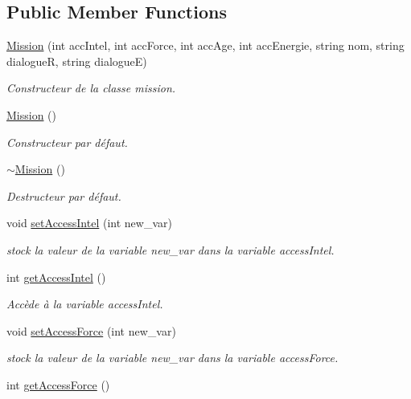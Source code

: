 \subsection*{Public Member Functions}
\begin{DoxyCompactItemize}
\item 
\hyperlink{class_mission_a7623e26167975876e1a7f483eed38d33}{Mission} (int acc\-Intel, int acc\-Force, int acc\-Age, int acc\-Energie, string nom, string dialogue\-R, string dialogue\-E)
\begin{DoxyCompactList}\small\item\em Constructeur de la classe mission. \end{DoxyCompactList}\item 
\hyperlink{class_mission_aa5a6ff4fc779338ab01b8f6dd470f4df}{Mission} ()
\begin{DoxyCompactList}\small\item\em Constructeur par défaut. \end{DoxyCompactList}\item 
\hyperlink{class_mission_ad1a61b34162393ac42be5955d9772921}{$\sim$\-Mission} ()
\begin{DoxyCompactList}\small\item\em Destructeur par défaut. \end{DoxyCompactList}\item 
void \hyperlink{class_mission_a8fb06ed6f8b7bf29b75729548c18c5e9}{set\-Access\-Intel} (int new\-\_\-var)
\begin{DoxyCompactList}\small\item\em stock la valeur de la variable new\-\_\-var dans la variable access\-Intel. \end{DoxyCompactList}\item 
int \hyperlink{class_mission_ab3ed2d8bde3f15489406775cec6ca3ae}{get\-Access\-Intel} ()
\begin{DoxyCompactList}\small\item\em Accède à la variable access\-Intel. \end{DoxyCompactList}\item 
void \hyperlink{class_mission_a23c1490b294d170c675279ee9296f1f2}{set\-Access\-Force} (int new\-\_\-var)
\begin{DoxyCompactList}\small\item\em stock la valeur de la variable new\-\_\-var dans la variable access\-Force. \end{DoxyCompactList}\item 
int \hyperlink{class_mission_ae443e12738d9e3c52f27f3630df68bbf}{get\-Access\-Force} ()

\end{DoxyCompactItemize}
